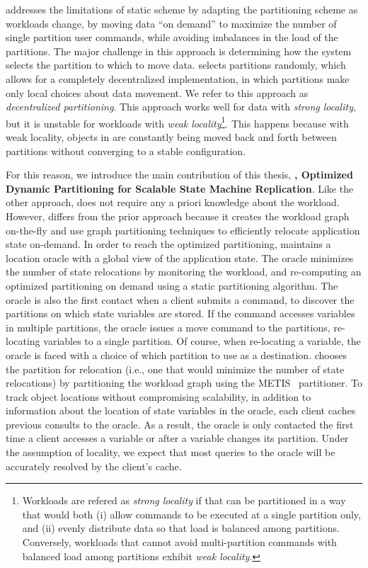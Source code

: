 \dssmr{} addresses the limitations of static scheme by adapting the partitioning
scheme as workloads change, by moving data ``on demand'' to maximize the number
of single partition user commands, while avoiding imbalances in the load of the
partitions. The major challenge in this approach is determining how the system
selects the partition to which to move data. \dssmr{} selects partitions
randomly, which allows for a completely decentralized implementation, in which
partitions make only local choices about data movement. We refer to this
approach as \emph{decentralized partitioning}. This approach works well for data
with \emph{strong locality}, but it is unstable for workloads with \emph{weak
locality}\footnote{Workloads are refered as \emph{strong locality} if that can
be partitioned in a way that would both (i) allow commands to be executed at a
single partition only, and (ii) evenly distribute data so that load is balanced
among partitions. Conversely, workloads that cannot avoid multi-partition
commands with balanced load among partitions exhibit \emph{weak locality}.}.
This happens because with weak locality, objects in \dssmr{} are constantly
being moved back and forth between partitions without converging to a stable
configuration.

For this reason, we introduce the main contribution of this thesis, \textbf{\dynastar,
Optimized Dynamic Partitioning for Scalable State Machine Replication}. Like the
other approach, \dynastar does not require any a priori knowledge about the
workload. However, \dynastar differs from the prior approach because it creates
the workload graph on-the-fly and use graph partitioning techniques to
efficiently relocate application state on-demand. In order to reach the
optimized partitioning,  \dynastar maintains a location oracle with a global
view of the application state. The oracle minimizes the number of state
relocations by monitoring the workload, and re-computing an optimized
partitioning on demand using a static partitioning algorithm. The oracle is also
the first contact when a client submits a command, to discover the partitions on
which state variables are stored. If the command accesses variables in multiple
partitions, the oracle issues a move command to the partitions, re-locating
variables to a single partition. Of course, when re-locating a variable, the
oracle is faced with a choice of which partition to use as a destination.
\dynastar chooses the partition for relocation (i.e., one that would minimize
the number of state relocations) by partitioning the workload graph using the
METIS~\cite{Abou-Rjeili:2006} partitioner. To track object locations without
compromising scalability, in addition to information about the location of state
variables in the oracle, each client caches previous consults to the oracle. As
a result, the oracle is only contacted the first time a client accesses a
variable or after a variable changes its partition. Under the assumption of
locality, we expect that most queries to the oracle will be accurately resolved
by the client's cache.

